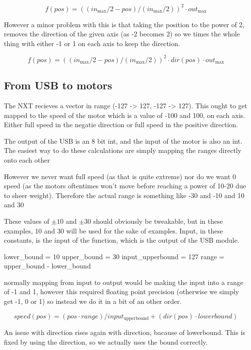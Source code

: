 $$
f(pos) = ((in_\text{max}/2 - pos)/(in_\text{max}/2))^2 \cdot out_\text{max}
$$

However a minor problem with this is that taking the position to the power of 2, removes the direction of the given axis (as -2 becomes 2)
so we times the whole thing with either -1 or 1 on each axis to keep the direction.

$$
f(pos) = ((in_\text{max}/2 - pos)/(in_\text{max}/2))^2 \cdot dir(pos) \cdot out_\text{max}
$$

\subsection{From USB to motors}
The NXT recieves a vector in range (-127 -> 127, -127 -> 127).
This ought to get mapped to the speed of the motor which is a value of -100 and 100, on each axis.
Either full speed in the negatie direction or full speed in the positive direction.


The output of the USB is an 8 bit int, and the input of the motor is also an int.
The easiest way to do these calculations are simply mapping the ranges directly onto each other

However we never want full speed (as that is quite extreme) nor do we want 0 speed (as the motors oftentimes won't move before reaching a power of 10-20 due to sheer weight).
Therefore the actual range is something like -30 and -10 and 10 and 30

These values of $\pm10$ and $\pm30$ should obviously be tweakable, but in these examples, 10 and 30 will be used for the sake of examples. 
Input, in these constants, is the input of the function, which is the output of the USB module.

	lower\_bound = 10
	upper\_bound = 30
	input\_upperbound = 127
	range = upper\_bound - lower\_bound

normally mapping from input to output would be making the input into a range of -1 and 1, however this required floating point precision (otherwise we simply get -1, 0 or 1) so instead we do it in a bit of an other order.

$$
speed(pos) = (pos \cdot range)/input_\text{upperbound} + (dir(pos) \cdot lowerbound)
$$

An issue with direction rises again with direction, bacause of lowerbound.
This is fixed by using the direction, so we actually uses the bound correctly.